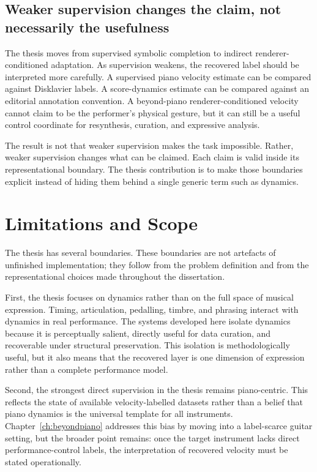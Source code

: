 \subsection{Weaker supervision changes the claim, not necessarily the usefulness}
\label{ssec:conclusion:supervision}

The thesis moves from supervised symbolic completion to indirect renderer-conditioned adaptation. As supervision weakens, the recovered label should be interpreted more carefully. A supervised piano velocity estimate can be compared against Disklavier labels. A score-dynamics estimate can be compared against an editorial annotation convention. A beyond-piano renderer-conditioned velocity cannot claim to be the performer's physical gesture, but it can still be a useful control coordinate for resynthesis, curation, and expressive analysis.

The result is not that weaker supervision makes the task impossible. Rather, weaker supervision changes what can be claimed. Each claim is valid inside its representational boundary. The thesis contribution is to make those boundaries explicit instead of hiding them behind a single generic term such as dynamics.

\section{Limitations and Scope}
\label{sec:conclusion:limitations}

The thesis has several boundaries. These boundaries are not artefacts of unfinished implementation; they follow from the problem definition and from the representational choices made throughout the dissertation.

First, the thesis focuses on dynamics rather than on the full space of musical expression. Timing, articulation, pedalling, timbre, and phrasing interact with dynamics in real performance. The systems developed here isolate dynamics because it is perceptually salient, directly useful for data curation, and recoverable under structural preservation. This isolation is methodologically useful, but it also means that the recovered layer is one dimension of expression rather than a complete performance model.

Second, the strongest direct supervision in the thesis remains piano-centric. This reflects the state of available velocity-labelled datasets rather than a belief that piano dynamics is the universal template for all instruments. Chapter~\ref{ch:beyondpiano} addresses this bias by moving into a label-scarce guitar setting, but the broader point remains: once the target instrument lacks direct performance-control labels, the interpretation of recovered velocity must be stated operationally.


